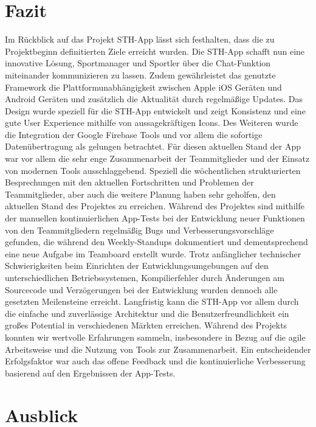 \chapter{Fazit}
Im Rückblick auf das Projekt STH-App lässt sich festhalten, dass die zu Projektbeginn definitierten Ziele erreicht wurden.
Die STH-App schafft nun eine innovative Lösung, Sportmanager und Sportler über die Chat-Funktion miteinander kommunizieren zu lassen.
Zudem gewährleistet das genutzte Framework die Plattformunabhängigkeit zwischen Apple iOS Geräten und Android Geräten und zusätzlich die Aktualität durch regelmäßige Updates.
Das Design wurde speziell für die STH-App entwickelt und zeigt Konsistenz und eine gute User Experience mithilfe von aussagekräftigen Icons.
Des Weiteren wurde die Integration der Google Firebase Tools und vor allem die sofortige Datenübertragung als gelungen betrachtet.\newline
Für diesen aktuellen Stand der App war vor allem die sehr enge Zusammenarbeit der Teammitglieder und der Einsatz von modernen Tools ausschlaggebend.
Speziell die wöchentlichen strukturierten Besprechungen mit den aktuellen Fortschritten und Problemen der Teammitglieder, aber auch die weitere Planung haben sehr geholfen, den aktuellen Stand des Projektes zu erreichen.
Während des Projektes sind mithilfe der manuellen kontinuierlichen App-Tests bei der Entwicklung neuer Funktionen von den Teammitgliedern regelmäßig Bugs und Verbesserungsvorschläge gefunden, die während den Weekly-Standups dokumentiert und dementsprechend eine neue Aufgabe im Teamboard erstellt wurde.\newline
Trotz anfänglicher technischer Schwierigkeiten beim Einrichten der Entwicklungsumgebungen auf den unterschiedlichen Betriebssystemen, Kompilierfehler durch Änderungen am Sourcecode und Verzögerungen bei der Entwicklung wurden dennoch alle gesetzten Meilensteine erreicht.
Langfristig kann die STH-App vor allem durch die einfache und zuverlässige Architektur und die Benutzerfreundlichkeit ein großes Potential in verschiedenen Märkten erreichen.\newline
Während des Projekts konnten wir wertvolle Erfahrungen sammeln, insbesondere in Bezug auf die agile Arbeitsweise und die Nutzung von Tools zur Zusammenarbeit.
Ein entscheidender Erfolgsfaktor war auch das offene Feedback und die kontinuierliche Verbesserung basierend auf den Ergebnissen der App-Tests.

\chapter{Ausblick}

